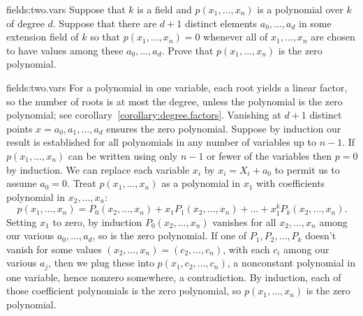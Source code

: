 \begin{problem}{fields:two.vars}
Suppose that \(k\) is a field and \(p(x_1,\dots,x_n)\) is a polynomial over \(k\) of degree \(d\).
Suppose that there are \(d+1\) distinct elements \(a_0,\dots,a_d\) in some extension field of \(k\) so that \(p(x_1,\dots,x_n)=0\) whenever all of \(x_1,\dots,x_n\) are chosen to have values among these \(a_0,\dots,a_d\).
Prove that \(p(x_1,\dots,x_n)\) is the zero polynomial.
\end{problem}
\begin{answer}{fields:two.vars}
For a polynomial in one variable, each root yields a linear factor, so the number of roots is at most the degree, unless the polynomial is the zero polynomial; see corollary~\vref{corollary:degree.factors}.
Vanishing at \(d+1\) distinct points \(x=a_0,a_1,\dots,a_d\) ensures the zero polynomial.
Suppose by induction our result is established for all polynomials in any number of variables up to \(n-1\).
If \(p(x_1,\dots,x_n)\) can be written using only \(n-1\) or fewer of the variables then \(p=0\) by induction.
We can replace each variable \(x_i\) by \(x_i=X_i+a_0\) to permit us to assume \(a_0=0\).
Treat \(p(x_1,\dots,x_n)\) as a polynomial in \(x_1\) with coefficients polynomial in \(x_2,\dots,x_n\):
\[
p(x_1,\dots,x_n)=P_0(x_2,\dots,x_n)+x_1P_1(x_2,\dots,x_n)+\dots+x_1^kP_k(x_2,\dots,x_n).
\]
Setting \(x_1\) to zero, by induction \(P_0(x_2,\dots,x_n)\) vanishes for all \(x_2,\dots,x_n\) among our various \(a_0,\dots,a_d\), so is the zero polynomial.
If one of \(P_1,P_2,\dots,P_k\) doesn't vanish for some values \((x_2,\dots,x_n)=(c_2,\dots,c_n)\), with each \(c_i\) among our various \(a_j\), then we plug these into \(p(x_1,c_2,\dots,c_n)\), a nonconstant polynomial in one variable, hence nonzero somewhere, a contradiction.
By induction, each of those coefficient polynomials is the zero polynomial, so \(p(x_1,\dots,x_n)\) is the zero polynomial.\end{answer}

